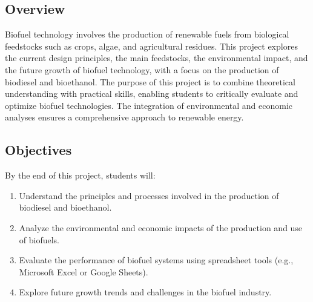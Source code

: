 \documentclass[letterpaper,10pt,english]{jupyterBook}
\begin{document}
\subsection{Overview}
\label{\detokenize{ProjectInstructions:id40}}
\sphinxAtStartPar
Biofuel technology involves the production of renewable fuels from biological feedstocks such as crops, algae, and agricultural residues. This project explores the current design principles, the main feedstocks, the environmental impact, and the future growth of biofuel technology, with a focus on the production of biodiesel and bioethanol. The purpose of this project is to combine theoretical understanding with practical skills, enabling students to critically evaluate and optimize biofuel technologies. The integration of environmental and economic analyses ensures a comprehensive approach to renewable energy.


\subsection{Objectives}
\label{\detokenize{ProjectInstructions:id41}}
\sphinxAtStartPar
By the end of this project, students will:
\begin{enumerate}
%
\item {} 
\sphinxAtStartPar
Understand the principles and processes involved in the production of biodiesel and bioethanol.

\item {} 
\sphinxAtStartPar
Analyze the environmental and economic impacts of the production and use of biofuels.

\item {} 
\sphinxAtStartPar
Evaluate the performance of biofuel systems using spreadsheet tools (e.g., Microsoft Excel or Google Sheets).

\item {} 
\sphinxAtStartPar
Explore future growth trends and challenges in the biofuel industry.

\end{enumerate}
\end{document}
